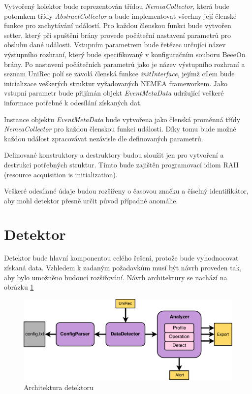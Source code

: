  Vytvořený kolektor bude reprezentován třídou \textit{NemeaCollector}, která bude potomkem třídy
 \textit{AbstractCollector} a bude implementovat všechny její členské funkce pro zachytávání událostí. Pro každou 
 členskou funkci  bude vytvořen setter, který při spuštění brány provede počáteční nastavení
 parametrů pro obsluhu dané 
 události. Vstupním parametrem bude řetězec určující název výstupního rozhraní, který bude
 specifikovaný v 
 konfiguračním souboru BeeeOn brány. Po nastavení počátečních parametrů jako je název výstupního
 rozhraní a seznam UniRec polí se zavolá členská funkce \textit{initInterface}, jejímž cílem bude inicializace
 veškerých struktur vyžadovaných NEMEA frameworkem.
 Jako vstupní parametr bude přijímán objekt \textit{EventMetaData} udržující veškeré informace potřebné 
 k odesílání získaných dat.
 
 Instance objektu \textit{EventMetaData} bude vytvořena jako členská proměnná třídy \textit{NemeaCollector}
 pro každou členskou funkci události. Díky tomu bude možné každou událost zpracovávat nezávisle dle
 definovaných parametrů.
 
 Definované konstruktory a destruktory budou sloužit jen pro vytvoření a destrukci potřebných 
 struktur. Tímto bude zajištěn programovací idiom RAII (resource acquisition is initialization).
 
 Veškeré odesílané údaje budou rozšířeny o časovou značku a číselný identifikátor, aby mohl detektor
 přesně určit původ případné anomálie.
    
 \section{Detektor}
 Detektor bude hlavní komponentou celého řešení, protože bude vyhodnocovat získaná data. Vzhledem
 k zadaným požadavkům musí být návrh proveden tak, aby bylo umožněno budoucí rozšiřování. Návrh 
 architektury se nachází na obrázku \ref{obr.detektor}
 \begin{figure}[ht]
   \begin{center}
   \includegraphics[scale=0.5]{pictures/detektor-arch}
   \caption{Architektura detektoru}
   \label{obr.detektor}
   \end{center}
   \end{figure}

